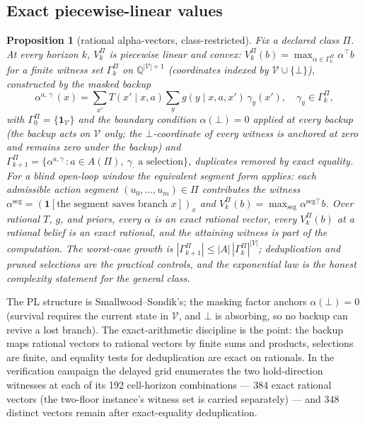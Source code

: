 \documentclass[10pt,twocolumn]{article}
\theoremstyle{plain}
\newtheorem{proposition}[theorem]{Proposition}
\theoremstyle{definition}
\theoremstyle{remark}
\begin{document}
\subsection{Exact piecewise-linear values}\label{exact}

\begin{proposition}[rational alpha-vectors, class-restricted]\label{prop:pl}
Fix a declared class \(\Pi\). At every horizon \(k\),
\(V^{\Pi}_{k}\) is piecewise linear and convex:
\(V^{\Pi}_{k}(b) = \max_{\alpha \in \Gamma^{\Pi}_{k}} \alpha^{\top} b\)
for a finite witness set \(\Gamma^{\Pi}_{k}\) on
\(\mathbb{Q}^{|\mathcal{V}|+1}\) (coordinates indexed by
\(\mathcal{V} \cup \{\bot\}\)), constructed by the masked backup
\[
\alpha^{a,\,\gamma_{\cdot}}(x) =
\sum_{x'} T(x' \mid x, a) \sum_{y} g(y \mid x, a, x')\, \gamma_{y}(x'),\quad
\gamma_{y} \in \Gamma^{\Pi}_{k},
\]
with \(\Gamma^{\Pi}_{0} = \{ \mathbf{1}_{\mathcal{V}} \}\) and the
boundary condition \(\alpha(\bot) = 0\) applied at every backup (the
backup acts on \(\mathcal{V}\) only; the \(\bot\)-coordinate of every
witness is anchored at zero and remains zero under the backup) and
\(\Gamma^{\Pi}_{k+1} = \{ \alpha^{a, \gamma_{\cdot}} : a \in A(\Pi),\
\gamma_{\cdot} \text{ a selection} \}\), duplicates removed by exact
equality. For a blind open-loop window the equivalent segment form
applies: each admissible action segment \((u_{0}, \dots, u_{m}) \in \Pi\)
contributes the witness
\(\alpha^{\mathrm{seg}} = (\mathbf{1}[\text{the segment saves branch } x])_{x}\)
and \(V^{\Pi}_{k}(b) = \max_{\mathrm{seg}} \alpha^{\mathrm{seg}\top} b\).
Over rational \(T\), \(g\), and priors, every \(\alpha\) is an exact
rational vector, every \(V^{\Pi}_{k}(b)\) at a rational belief is an exact
rational, and the attaining witness is part of the computation. The
worst-case growth is
\(|\Gamma^{\Pi}_{k+1}| \le |A|\,|\Gamma^{\Pi}_{k}|^{|Y|}\);
deduplication and pruned selections are the practical controls, and the
exponential law is the honest complexity statement for the general class.
\end{proposition}

The PL structure is Smallwood--Sondik's; the masking factor anchors
\(\alpha(\bot) = 0\) (survival requires the current state in
\(\mathcal{V}\), and \(\bot\) is absorbing, so no backup can revive a lost
branch). The exact-arithmetic discipline is the point: the backup maps
rational vectors to rational vectors by finite sums and products,
selections are finite, and equality tests for deduplication are exact on
rationals. In the verification campaign the delayed grid enumerates the two
hold-direction witnesses at each of its 192 cell-horizon combinations ---
384 exact rational vectors (the two-floor instance's witness set is
carried separately) --- and 348 distinct vectors remain after
exact-equality deduplication.
\end{document}
